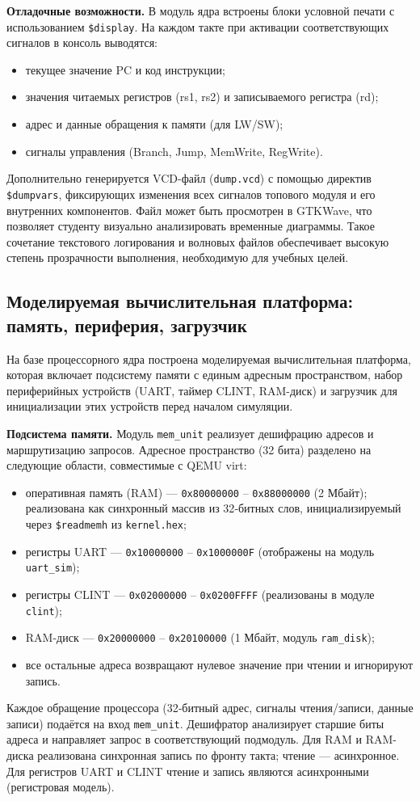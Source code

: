 \textbf{Отладочные возможности.} В модуль ядра встроены блоки условной печати с использованием \texttt{\$display}. На каждом такте при активации соответствующих сигналов в консоль выводятся:
\begin{itemize}
  \item текущее значение PC и код инструкции;
  \item значения читаемых регистров (rs1, rs2) и записываемого регистра (rd);
  \item адрес и данные обращения к памяти (для LW/SW);
  \item сигналы управления (Branch, Jump, MemWrite, RegWrite).
\end{itemize}
Дополнительно генерируется VCD-файл (\texttt{dump.vcd}) с помощью директив \texttt{\$dumpvars}, фиксирующих изменения всех сигналов топового модуля и его внутренних компонентов. Файл может быть просмотрен в GTKWave, что позволяет студенту визуально анализировать временные диаграммы. Такое сочетание текстового логирования и волновых файлов обеспечивает высокую степень прозрачности выполнения, необходимую для учебных целей.

\subsection{Моделируемая вычислительная платформа: память, периферия, загрузчик}

На базе процессорного ядра построена моделируемая вычислительная платформа, которая включает подсистему памяти с единым адресным пространством, набор периферийных устройств (UART, таймер CLINT, RAM-диск) и загрузчик для инициализации этих устройств перед началом симуляции.

\textbf{Подсистема памяти.} Модуль \texttt{mem\_unit} реализует дешифрацию адресов и маршрутизацию запросов. Адресное пространство (32 бита) разделено на следующие области, совместимые с QEMU virt:
\begin{itemize}
  \item оперативная память (RAM) — \texttt{0x80000000} – \texttt{0x88000000} (2 Мбайт); реализована как синхронный массив из 32‑битных слов, инициализируемый через \texttt{\$readmemh} из \texttt{kernel.hex};
  \item регистры UART — \texttt{0x10000000} – \texttt{0x1000000F} (отображены на модуль \texttt{uart\_sim});
  \item регистры CLINT — \texttt{0x02000000} – \texttt{0x0200FFFF} (реализованы в модуле \texttt{clint});
  \item RAM-диск — \texttt{0x20000000} – \texttt{0x20100000} (1 Мбайт, модуль \texttt{ram\_disk});
  \item все остальные адреса возвращают нулевое значение при чтении и игнорируют запись.
\end{itemize}
Каждое обращение процессора (32‑битный адрес, сигналы чтения/записи, данные записи) подаётся на вход \texttt{mem\_unit}. Дешифратор анализирует старшие биты адреса и направляет запрос в соответствующий подмодуль. Для RAM и RAM-диска реализована синхронная запись по фронту такта; чтение — асинхронное. Для регистров UART и CLINT чтение и запись являются асинхронными (регистровая модель).

